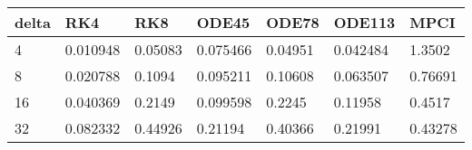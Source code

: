 \begin{tabular}{lllllll}
delta & RK4 & RK8 & ODE45 & ODE78 & ODE113 & MPCI \\ 
\hline 
4 & 0.010948 & 0.05083 & 0.075466 & 0.04951 & 0.042484 & 1.3502 \\ 
8 & 0.020788 & 0.1094 & 0.095211 & 0.10608 & 0.063507 & 0.76691 \\ 
16 & 0.040369 & 0.2149 & 0.099598 & 0.2245 & 0.11958 & 0.4517 \\ 
32 & 0.082332 & 0.44926 & 0.21194 & 0.40366 & 0.21991 & 0.43278 \\ 
\hline 
\end{tabular}